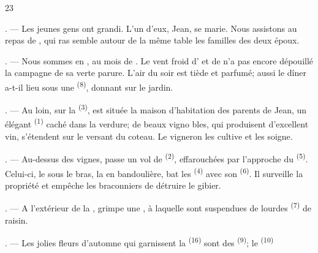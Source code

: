 \begin{VUpage}[25]{23}
\VUsaut{4.0mm}
\VUsaut{1.6mm}
\VUsaut{3.2mm}

\VUsaut{1.6mm}
\VUsaut{3.0mm}

. --- Les jeunes gens ont grandi. L'un d'eux, Jean,\nl
se marie. Nous assistons au repas de , qui ras\cc
semble autour de la même table les familles des deux\nl
époux.

. --- Nous sommes en , au mois de \cc
{}. Le vent froid d' et de \nl
n'a pas encore dépouillé la campagne de sa verte\nl
parure. L'air du soir est tiède et parfumé; aussi le\nl
dîner a-t-il lieu sous une  \textsuperscript{(8)}, donnant sur le\nl
jardin.

. --- Au loin, sur la  \textsuperscript{(3)}, est située la\nl
maison d'habitation des parents de Jean, un élégant\nl
{} \textsuperscript{(1)} caché dans la verdure; de beaux vigno\cc
bles, qui produisent d'excellent vin, s'étendent sur le\nl
versant du coteau. Le vigneron les cultive et les\nl
soigne.

. --- Au-dessus des vignes, passe un vol de \cc
{} \textsuperscript{(2)}, effarouchées par l'approche du \cc
{} \textsuperscript{(5)}. Celui-ci, le  sous le bras, la \cc
{} en bandoulière, bat les  \textsuperscript{(4)} avec son\nl
{} \textsuperscript{(6)}. Il surveille la propriété et empêche les\nl
braconniers de détruire le gibier.

. --- A l'extérieur de la , grimpe une\nl
{}, à laquelle sont suspendues de lourdes\nl
{} \textsuperscript{(7)} de raisin.

. --- Les jolies fleurs d'automne qui garnissent la\nl
{} \textsuperscript{(16)} sont des  \textsuperscript{(9)}; le  \textsuperscript{(10)}
\parplein
\end{VUpage}


